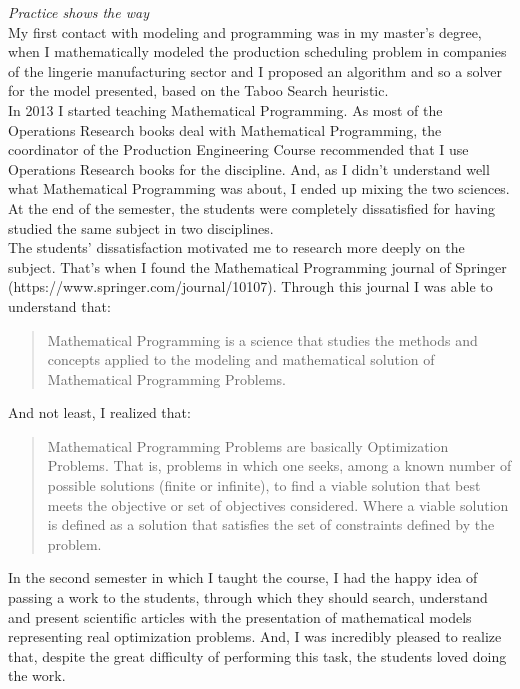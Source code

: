 \documentclass{book}
\begin{document}
\emph{Practice shows the way} \\

My first contact with modeling and programming was in my master's degree, when I mathematically modeled the production scheduling problem in companies of the lingerie manufacturing sector and I proposed an algorithm and so a solver for the model presented, based on the Taboo Search heuristic. \\

In 2013 I started teaching Mathematical Programming. As most of the Operations Research books deal with Mathematical Programming, the coordinator of the Production Engineering Course recommended that I use Operations Research books for the discipline. And, as I didn't understand well what Mathematical Programming was about, I ended up mixing the two sciences. At the end of the semester, the students were completely dissatisfied for having studied the same subject in two disciplines. \\

The students' dissatisfaction motivated me to research more deeply on the subject. That's when I found the Mathematical Programming journal of Springer (https://www.springer.com/journal/10107). Through this journal I was able to understand that: \\

\begin{quotation}
\noindent Mathematical Programming is a science that studies the methods and concepts applied to the modeling and mathematical solution of Mathematical Programming Problems. \\
\end{quotation}

And not least, I realized that: \\

\begin{quotation}

\noindent Mathematical Programming Problems are basically Optimization Problems. That is, problems in which one seeks, among a known number of possible solutions (finite or infinite), to find a viable solution that best meets the objective or set of objectives considered. Where a viable solution is defined as a solution that satisfies the set of constraints defined by the problem. \\

\end{quotation}

In the second semester in which I taught the course, I had the happy idea of passing a work to the students, through which they should search, understand and present scientific articles with the presentation of mathematical models representing real optimization problems. And, I was incredibly pleased to realize that, despite the great difficulty of performing this task, the students loved doing the work. \\
\end{document}
